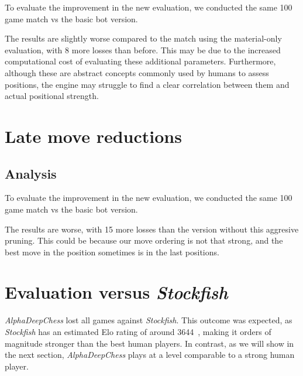 To evaluate the improvement in the new evaluation, we conducted the same 100 game match vs the basic bot version. 

\begin{center}
\medskip
\end{center}

\noindent The results are slightly worse compared to the match using the material-only evaluation, with 8 more losses than before. This may be due to the increased computational cost of evaluating these additional parameters. Furthermore, although these are abstract concepts commonly used by humans to assess positions, the engine may struggle to find a clear correlation between them and actual positional strength.

\section{Late move reductions}

\subsection*{Analysis}

To evaluate the improvement in the new evaluation, we conducted the same 100 game match vs the basic bot version.

\begin{center}
\medskip
\end{center}

\noindent The results are worse, with 15 more losses than the version without this aggresive pruning. This could be because our move ordering is not that strong, and the best move in the position sometimes is in the last positions.

\newpage

\section{Evaluation versus \textit{Stockfish}}

\begin{center}
\medskip
\end{center}

\noindent \textit{AlphaDeepChess} lost all games against \textit{Stockfish}. This outcome was expected, as \textit{Stockfish} has an estimated Elo rating of around 3644~\cite{StockfishElo}, making it orders of magnitude stronger than the best human players. In contrast, as we will show in the next section, \textit{AlphaDeepChess} plays at a level comparable to a strong human player.

